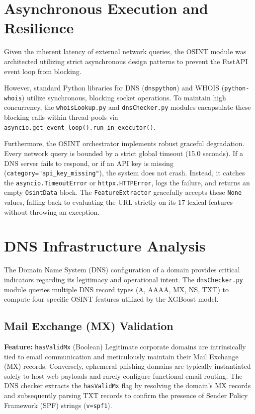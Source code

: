 \section{Asynchronous Execution and
Resilience}\label{asynchronous-execution-and-resilience}

Given the inherent latency of external network queries, the OSINT module
was architected utilizing strict asynchronous design patterns to prevent
the FastAPI event loop from blocking.

However, standard Python libraries for DNS (\texttt{dnspython}) and
WHOIS (\texttt{python-whois}) utilize synchronous, blocking socket
operations. To maintain high concurrency, the \texttt{whoisLookup.py}
and \texttt{dnsChecker.py} modules encapsulate these blocking calls
within thread pools via
\texttt{asyncio.get\_event\_loop().run\_in\_executor()}.

Furthermore, the OSINT orchestrator implements robust graceful
degradation. Every network query is bounded by a strict global timeout
(15.0 seconds). If a DNS server fails to respond, or if an API key is
missing (\texttt{category="api\_key\_missing"}), the system does not
crash. Instead, it catches the \texttt{asyncio.TimeoutError} or
\texttt{httpx.HTTPError}, logs the failure, and returns an empty
\texttt{OsintData} block. The \texttt{FeatureExtractor} gracefully
accepts these \texttt{None} values, falling back to evaluating the URL
strictly on its 17 lexical features without throwing an exception.

\section{DNS Infrastructure
Analysis}\label{dns-infrastructure-analysis-1}

The Domain Name System (DNS) configuration of a domain provides critical
indicators regarding its legitimacy and operational intent. The
\texttt{dnsChecker.py} module queries multiple DNS record types (A,
AAAA, MX, NS, TXT) to compute four specific OSINT features utilized by
the XGBoost model.

\subsection{Mail Exchange (MX)
Validation}\label{mail-exchange-mx-validation}

\textbf{Feature:} \texttt{hasValidMx} (Boolean) Legitimate corporate
domains are intrinsically tied to email communication and meticulously
maintain their Mail Exchange (MX) records. Conversely, ephemeral
phishing domains are typically instantiated solely to host web payloads
and rarely configure functional email routing. The DNS checker extracts
the \texttt{hasValidMx} flag by resolving the domain's MX records and
subsequently parsing TXT records to confirm the presence of Sender
Policy Framework (SPF) strings (\texttt{v=spf1}).

